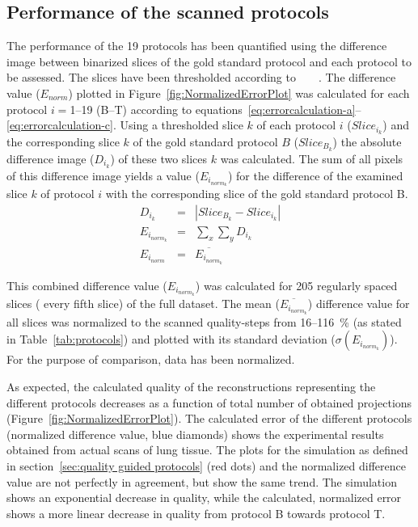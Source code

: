 \subsection{Performance of the scanned protocols}
The performance of the 19 protocols has been quantified using the difference image between binarized slices of the gold standard protocol and each protocol to be assessed. The slices have been thresholded according to%
\ifhtml%
	~\citet{Otsu1979}%
\else%
	~%
\fi%
. The difference value ($E_{norm}$) plotted in Figure~\ref{fig:NormalizedErrorPlot} was calculated for each protocol $i=$1--19 (B--T) according to equations~\ref{eq:errorcalculation-a}--\ref{eq:errorcalculation-c}. Using a thresholded slice $k$ of each protocol $i$ ($Slice_{i_{k}}$) and the corresponding slice $k$ of the gold standard protocol $B$ ($Slice_{B_{k}}$) the absolute difference image ($D_{i_{k}}$) of these two slices $k$ was calculated. The sum of all pixels of this difference image yields a value ($E_{i_{norm_{k}}}$) for the difference of the examined slice $k$ of protocol $i$ with the corresponding slice of the gold standard protocol B.
\begin{eqnarray}
	D_{i_{k}} &=& |Slice_{B_{k}}-Slice_{i_{k}}|\label{eq:errorcalculation-a}\\%
	E_{i_{norm_{k}}} &=& \sum_{x}\sum_{y} D_{i_{k}}\label{eq:errorcalculation-b}\\%
	E_{i_{norm}} &=& \overline{E_{i_{norm_{k}}}}\label{eq:errorcalculation-c}%
\end{eqnarray}

This combined difference value ($E_{i_{norm_{k}}}$) was calculated for 205 regularly spaced slices (%
every fifth slice) of the full dataset. The mean ($\overline{E_{i_{norm_{k}}}}$) difference value for all slices was normalized to the scanned quality-steps from 16--\SI{116}{\percent} (as stated in Table~\ref{tab:protocols}) and plotted with its standard deviation ($\sigma(E_{i_{norm_{k}}})$). For the purpose of comparison, data has been normalized.

As expected, the calculated quality of the reconstructions representing the different protocols decreases as a function of total number of obtained projections (Figure~\ref{fig:NormalizedErrorPlot}). The calculated error of the different protocols (normalized difference value, blue diamonds) shows the experimental results obtained from actual scans of lung tissue. The plots for the simulation as defined in section~\ref{sec:quality guided protocols} (red dots) and the normalized difference value are not perfectly in agreement, but show the same trend. The simulation shows an exponential decrease in quality, while the calculated, normalized error shows a more linear decrease in quality from protocol B towards protocol T.

